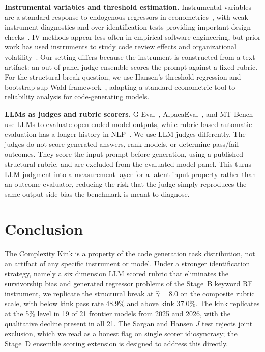 \documentclass[conference]{IEEEtran}
\begin{document}
\textbf{Instrumental variables and threshold estimation.} Instrumental variables are a standard response to endogenous regressors in econometrics~\cite{wooldridge2010econometric}, with weak-instrument diagnostics and over-identification tests providing important design checks~\cite{stock2005testing,hansen1982large,bowsher2002reject}. IV methods appear less often in empirical software engineering, but prior work has used instruments to study code review effects and organizational volatility~\cite{mcintosh2016empirical,mockus2010organizational}. Our setting differs because the instrument is constructed from a text artifact: an out-of-panel judge ensemble scores the prompt against a fixed rubric. For the structural break question, we use Hansen's threshold regression and bootstrap sup-Wald framework~\cite{hansen2000sample}, adapting a standard econometric tool to reliability analysis for code-generating models.

\textbf{LLMs as judges and rubric scorers.} G-Eval~\cite{liu2023geval}, AlpacaEval~\cite{alpacaeval}, and MT-Bench~\cite{zheng2023judging} use LLMs to evaluate open-ended model outputs, while rubric-based automatic evaluation has a longer history in NLP~\cite{hashimoto2019unifying}. We use LLM judges differently. The judges do not score generated answers, rank models, or determine pass/fail outcomes. They score the input prompt before generation, using a published structural rubric, and are excluded from the evaluated model panel. This turns LLM judgment into a measurement layer for a latent input property rather than an outcome evaluator, reducing the risk that the judge simply reproduces the same output-side bias the benchmark is meant to diagnose.

\section{Conclusion}

The Complexity Kink is a property of the code generation task distribution, not an artifact of any specific instrument or model. Under a stronger identification strategy, namely a six dimension LLM scored rubric that eliminates the survivorship bias and generated regressor problems of the Stage~B keyword RF instrument, we replicate the structural break at $\hat{\gamma}=8.0$ on the composite rubric scale, with below kink pass rate 48.9\% and above kink 37.0\%. The kink replicates at the 5\% level in 19 of 21 frontier models from 2025 and 2026, with the qualitative decline present in all 21. The Sargan and Hansen $J$ test rejects joint exclusion, which we read as a honest flag on single scorer idiosyncrasy; the Stage~D ensemble scoring extension is designed to address this directly.
\end{document}
